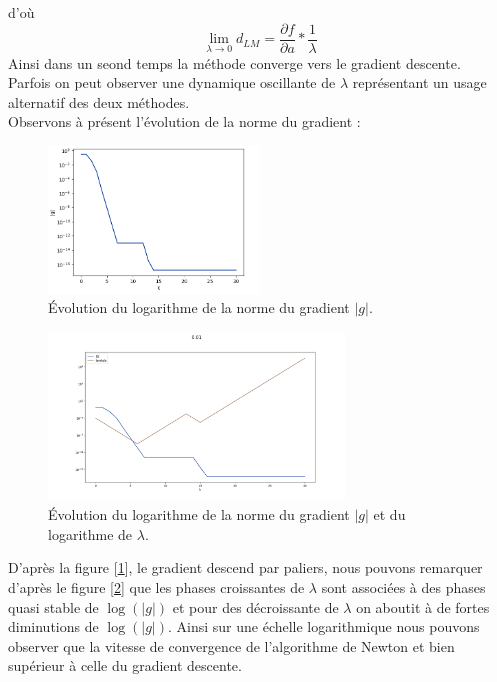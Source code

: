 \documentclass[12pt]{article}
\begin{document}
d'où $$\lim_{\lambda\to 0} d_{LM} =\frac{\partial f}{\partial a} * \frac{1}{\lambda} $$
Ainsi dans un seond temps la méthode converge vers le gradient descente.\\
Parfois on peut observer une  dynamique oscillante de $\lambda$ représentant un usage alternatif des deux méthodes.\\


Observons à présent l'évolution de la norme du gradient :

\begin{figure}[H]
\centering
\includegraphics[width=0.5\textwidth]{GRAD_Q9.png}
\caption{ Évolution du logarithme de la norme du gradient $|g|$.}
\label{fig:ag}
\end{figure}

\begin{figure}[H]
\centering
\includegraphics[width=0.7\textwidth]{COMP_GRAD_L.png}
\caption{ Évolution du logarithme de la norme du gradient $|g|$ et du logarithme de $\lambda$.}
\label{fig:ag2}
\end{figure} 


D'après la figure [\ref{fig:ag}], le gradient descend par paliers, nous pouvons remarquer d'après le figure [\ref{fig:ag2}] que les phases croissantes de $\lambda$ sont associées à des phases quasi stable de $\log(|g|)$ et pour des décroissante de $\lambda$ on aboutit à de fortes diminutions de $\log(|g|)$. Ainsi sur une échelle logarithmique nous pouvons observer que la vitesse de convergence de l'algorithme de Newton et bien supérieur à celle du gradient descente.
\end{document}
